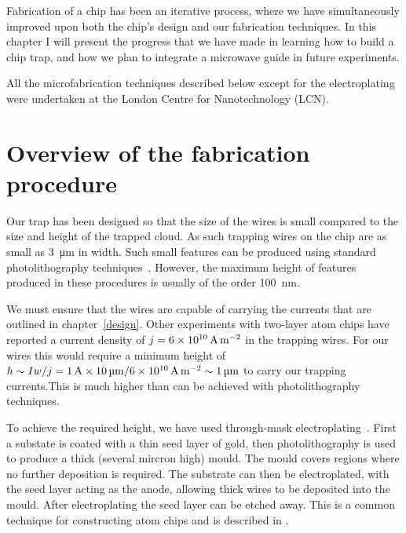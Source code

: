 Fabrication of a chip has been an iterative process, where we have
simultaneously improved upon both the chip's design and our fabrication
techniques.
In this chapter I will present the progress that we have made in
learning how to build a chip trap, and how we plan to integrate a microwave
guide in future experiments. 

All the microfabrication techniques described below except for the
electroplating were undertaken at the London Centre for Nanotechnology (LCN). 

\section{Overview of the fabrication procedure}

Our trap has been designed so that the size of the wires is small compared to
the size and height of the trapped cloud. As such trapping wires on the chip
are as small as \SI{3}{\micro\meter} in width. Such small features can be
produced using standard photolithography techniques~\cite{Madou2002}. However,
the maximum height of features produced in these procedures is usually of the
order \SI{100}{\nano\meter}.

We must ensure that the wires are capable of carrying the currents that are
outlined in chapter~\ref{design}.  Other experiments with two-layer atom chips
have reported a current density of $j=\SI{6E10}{\ampere\per\meter\squared}$ in
the trapping wires. For our wires this would require a minimum height of $h
\sim I w/j = \SI{1}{\ampere} \times
\SI{10}{\micro\meter}/\SI{6E10}{\ampere\per\meter\squared} \sim
\SI{1}{\micro\meter}$  to carry our trapping currents.This is much higher than
can be achieved with photolithography techniques.

To achieve the required height, we have used through-mask
electroplating~\cite{Ruythooren_2000}. First a substate is coated with a thin
seed layer of gold, then photolithography is used to produce a thick (several
mircron high) mould. The mould covers regions where no further deposition is
required. The substrate can then be electroplated, with the seed layer acting
as the anode, allowing thick wires to be deposited into the mould.
After electroplating the seed layer can be etched away. This is a common
technique for constructing atom chips and is described in .

